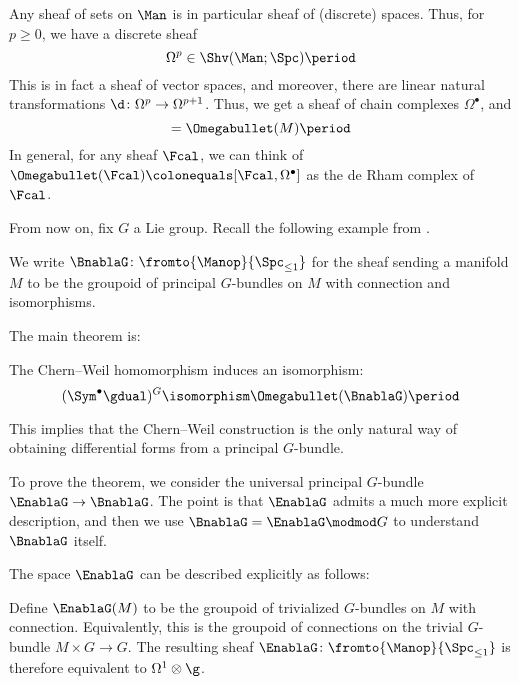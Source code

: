 \begin{example}
  Any sheaf of sets on $\Man$ is in particular sheaf of (discrete) spaces. Thus, for $p \geq 0$, we have a discrete sheaf
  \begin{equation*}
    \Omega^p \in \Shv(\Man;\Spc)\period
  \end{equation*}
  This is in fact a sheaf of vector spaces, and moreover, there are linear natural transformations ${\d\colon\Omega^p \to \Omega^{p + 1}}$. Thus, we get a sheaf of chain complexes $\Omega^{\bullet}$, and
  \begin{equation*}
    [M, \Omegabullet] = \Omegabullet(M)\period
  \end{equation*}
  In general, for any sheaf $\Fcal$, we can think of $\Omegabullet (\Fcal) \colonequals [\Fcal, \Omega^{\bullet}]$ as the de Rham complex of $\Fcal$.  
\end{example}

From now on, fix $G$ a Lie group. Recall the following example from .

\begin{example}
  We write $ \BnablaG \colon \fromto{\Manop}{\Spc_{\leq 1}} $ for the sheaf sending a manifold $ M $ to be the groupoid of principal $G$-bundles on $M$ with connection and isomorphisms.
\end{example}

The main theorem is:

\begin{theorem}
  The Chern--Weil homomorphism induces an isomorphism:
  \begin{equation*}
    (\Sym^\bullet\gdual)^G \isomorphism \Omegabullet (\BnablaG) \period
  \end{equation*}
\end{theorem}
\noindent This implies that the Chern--Weil construction is the only natural way of obtaining differential forms from a principal $G$-bundle.

To prove the theorem, we consider the universal principal $G$-bundle $\EnablaG \to \BnablaG$. The point is that $\EnablaG$ admits a much more explicit description, and then we use $\BnablaG = \EnablaG \modmod G$ to understand $\BnablaG$ itself.

The space $\EnablaG$ can be described explicitly as follows:

\begin{example}
  Define $\EnablaG (M)$ to be the groupoid of trivialized $G$-bundles on $M$ with connection. Equivalently, this is the groupoid of connections on the trivial $G$-bundle $M \times G \to G$. 
  The resulting sheaf $\EnablaG\colon \fromto{\Manop}{\Spc_{\leq 1}}$ is therefore equivalent to $\Omega^1 \otimes\g$.  
\end{example}

